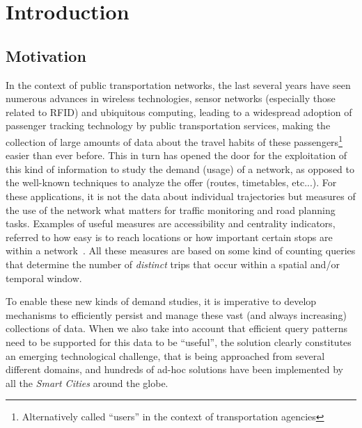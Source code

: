 \documentclass[a4paper,10pt,twoside]{book}
\begin{document}
\pagestyle{fancy}\fancyfoot{}\fancyhead{}
\fancyhead[LO]{\slshape\nouppercase{\rightmark}}
\fancyhead[RE]{\slshape\nouppercase{\leftmark}}
\fancyhead[RO,LE]{\slshape \thepage}

\frontmatter




\mainmatter

\chapter{Introduction}
	\section{Motivation}
	In the context of public transportation networks, the last several years have seen numerous advances in wireless technologies, sensor networks (especially those related to RFID) and ubiquitous computing, leading to a widespread adoption of passenger tracking technology by public transportation services, making the collection of large amounts of data about the travel habits of these passengers\footnote{Alternatively called ``users'' in the context of transportation agencies} easier than ever before.
	This in turn has opened the door for the exploitation of this kind of information to study the demand (usage) of a network, as opposed to the well-known techniques to analyze the offer (routes, timetables, etc...). 
	For these applications, it is not the data about individual trajectories but measures of the use of the network what matters for traffic monitoring and road planning tasks. Examples of useful measures are  accessibility and centrality indicators, referred to how easy  is to reach locations or how important certain stops are within a network~\cite{Morency2007193, El-Geneidy2011, Wang2015335}. All these measures are based on some kind of counting queries that determine the number of \textit{distinct} trips that occur within a spatial and/or temporal window.
	
	To enable these new kinds of demand studies, it is imperative to develop mechanisms to efficiently persist and manage these vast (and always increasing) collections of data. When we also take into account that efficient query patterns need to be supported for this data to be ``useful'', the solution clearly constitutes an emerging technological challenge, that is being approached from several different domains, and hundreds of ad-hoc solutions have been implemented by all the \textit{Smart Cities} around the globe.
	
\end{document}
